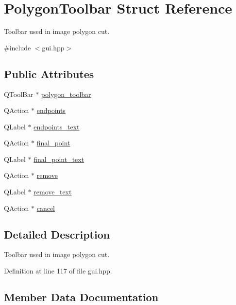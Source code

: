 \hypertarget{structPolygonToolbar}{}\section{Polygon\+Toolbar Struct Reference}
\label{structPolygonToolbar}


Toolbar used in image polygon cut.  




{\ttfamily \#include $<$gui.\+hpp$>$}

\subsection*{Public Attributes}
\begin{DoxyCompactItemize}
\item 
Q\+Tool\+Bar $\ast$ \mbox{\hyperlink{structPolygonToolbar_a5388c77217c5bea7075cf234c508b8d6}{polygon\+\_\+toolbar}}
\item 
Q\+Action $\ast$ \mbox{\hyperlink{structPolygonToolbar_a78a569efc30754e02b7d8f5d74ede0ec}{endpoints}}
\item 
Q\+Label $\ast$ \mbox{\hyperlink{structPolygonToolbar_a4ab3ad9905d894a2f166a4e1cbfb9e3a}{endpoints\+\_\+text}}
\item 
Q\+Action $\ast$ \mbox{\hyperlink{structPolygonToolbar_a25d471a6081bfa4107d5f1cd9a61d243}{final\+\_\+point}}
\item 
Q\+Label $\ast$ \mbox{\hyperlink{structPolygonToolbar_a3af92f094b85ad63be4d9dcf37a88fa8}{final\+\_\+point\+\_\+text}}
\item 
Q\+Action $\ast$ \mbox{\hyperlink{structPolygonToolbar_ad5f83fc2ac8daf17ae3014d05d3f5d5b}{remove}}
\item 
Q\+Label $\ast$ \mbox{\hyperlink{structPolygonToolbar_ad396d8e37e491bb7bfa8bf91d318014c}{remove\+\_\+text}}
\item 
Q\+Action $\ast$ \mbox{\hyperlink{structPolygonToolbar_aea894e742da9051f58af268c43212a22}{cancel}}
\end{DoxyCompactItemize}


\subsection{Detailed Description}
Toolbar used in image polygon cut. 

Definition at line 117 of file gui.\+hpp.



\subsection{Member Data Documentation}
\mbox{\label{structPolygonToolbar_aea894e742da9051f58af268c43212a22}} 
